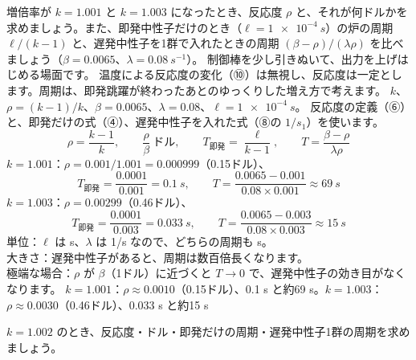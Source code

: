\label{ph:原-15:ex8}
\begin{phreidai}[反応度と炉の周期]
増倍率が $k=1.001$ と $k=1.003$ になったとき、反応度 $\rho$ と、それが何ドルかを求めましょう。また、即発中性子だけのとき（$\ell=\qty{1e-4}{s}$）の炉の周期 $\ell/(k-1)$ と、遅発中性子を1群で入れたときの周期 $(\beta-\rho)/(\lambda\rho)$ を比べましょう（$\beta=0.0065$、$\lambda=\qty{0.08}{s^{-1}}$）。
\phbamen
制御棒を少し引きぬいて、出力を上げはじめる場面です。
\phmushi
温度による反応度の変化（⑩）は無視し、反応度は一定とします。周期は、即発跳躍が終わったあとのゆっくりした増え方で考えます。
\phzu
$k$、$\rho=(k-1)/k$、$\beta=0.0065$、$\lambda=0.08$、$\ell=\qty{1e-4}{s}$。
\phriyu
反応度の定義（⑥）と、即発だけの式（④）、遅発中性子を入れた式（⑧の $1/s_1$）を使います。
\phtateru
\[ \rho=\frac{k-1}{k},\qquad \frac{\rho}{\beta}\ \text{ドル},\qquad T_{\text{即発}}=\frac{\ell}{k-1},\qquad T=\frac{\beta-\rho}{\lambda\rho} \]
\phtoku
$k=1.001$：$\rho=0.001/1.001=0.000999$（0.15ドル）、
\[ T_{\text{即発}}=\frac{0.0001}{0.001}=\qty{0.1}{s},\qquad T=\frac{0.0065-0.001}{0.08\times0.001}\approx\qty{69}{s} \]
$k=1.003$：$\rho=0.00299$（0.46ドル）、
\[ T_{\text{即発}}=\frac{0.0001}{0.003}=\qty{0.033}{s},\qquad T=\frac{0.0065-0.003}{0.08\times0.003}\approx\qty{15}{s} \]
\phtashikame
単位：$\ell$ は s、$\lambda$ は 1/s なので、どちらの周期も s。\\
大きさ：遅発中性子があると、周期は数百倍長くなります。\\
極端な場合：$\rho$ が $\beta$（1ドル）に近づくと $T\to0$ で、遅発中性子の効き目がなくなります。
\kotae $k=1.001$：$\rho\approx0.0010$（0.15ドル）、0.1 s と約69 s。$k=1.003$：$\rho\approx0.0030$（0.46ドル）、0.033 s と約15 s
\end{phreidai}
\begin{jibun}
$k=1.002$ のとき、反応度・ドル・即発だけの周期・遅発中性子1群の周期を求めましょう。
\end{jibun}

